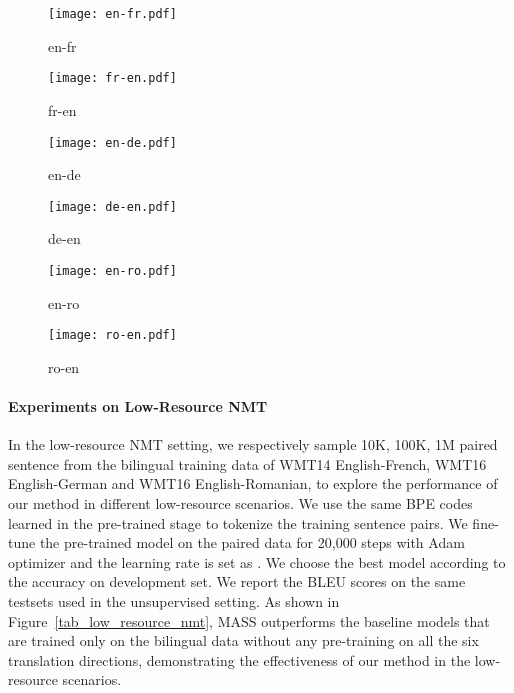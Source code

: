 \documentclass{article}
\begin{document}
	\begin{figure*}[h] 
		\centering
		\begin{subfigure}[h]{0.15\textwidth}
			\centering
			\texttt{[image: en-fr.pdf]}
			\vspace{-0.5cm}
			\caption{en-fr}
		\end{subfigure}
		\begin{subfigure}[h]{0.15\textwidth}
			\centering
			\texttt{[image: fr-en.pdf]}
			\vspace{-0.5cm}
			\caption{fr-en}
		\end{subfigure}	
		\begin{subfigure}[h]{0.15\textwidth}
			\centering
			\texttt{[image: en-de.pdf]}
			\vspace{-0.5cm}
			\caption{en-de}
		\end{subfigure}
		\begin{subfigure}[h]{0.15\textwidth}
			\centering
			\texttt{[image: de-en.pdf]}
			\vspace{-0.5cm}
			\caption{de-en}
		\end{subfigure}
		\begin{subfigure}[h]{0.15\textwidth}
			\centering
			\texttt{[image: en-ro.pdf]}
			\vspace{-0.5cm}
			\caption{en-ro}
		\end{subfigure}	
		\begin{subfigure}[h]{0.15\textwidth}
			\centering
			\texttt{[image: ro-en.pdf]}
			\vspace{-0.5cm}
			\caption{ro-en}
		\end{subfigure}	
		\vspace{-0.2cm}
		\caption{The BLEU score comparisons between MASS and the baseline on low-resource NMT with different scales of paired data.}
		\label{tab_low_resource_nmt}
	\end{figure*}
	
	\paragraph{Experiments on Low-Resource NMT}
	In the low-resource NMT setting, we respectively sample 10K, 100K, 1M paired sentence from the bilingual training data of WMT14 English-French, WMT16 English-German and WMT16 English-Romanian, to explore the performance of our method in different low-resource scenarios. We use the same BPE codes learned in the pre-trained stage to tokenize the training sentence pairs. We fine-tune the pre-trained model on the paired data for 20,000 steps with Adam optimizer and the learning rate is set as . We choose the best model according to the accuracy on development set. We report the BLEU scores on the same testsets used in the unsupervised setting. As shown in Figure~\ref{tab_low_resource_nmt}, MASS outperforms the baseline models that are trained only on the bilingual data without any pre-training on all the six translation directions, demonstrating the effectiveness of our method in the low-resource scenarios.
	
\end{document}
